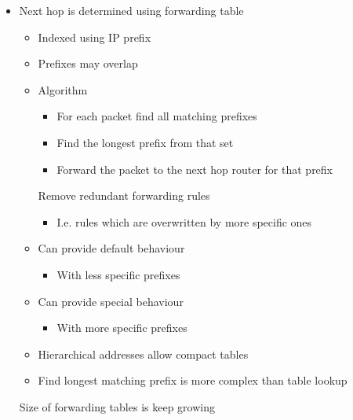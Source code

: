 \begin{itemize}
\begin{itemize}
            \item Next hop is determined using forwarding table
                \begin{itemize}
                    \item Indexed using IP prefix
                    \item Prefixes may overlap
                \end{itemize}
                \begin{itemize}
                    \item Algorithm
                        \begin{itemize}
                            \item For each packet find all matching prefixes
                            \item Find the longest prefix from that set
                            \item Forward the packet to the next hop router for that prefix
                        \end{itemize}
                     Remove redundant forwarding rules
                        \begin{itemize}
                            \item I.e. rules which are overwritten by more specific ones
                        \end{itemize}
                    \item Can provide default behaviour
                        \begin{itemize}
                            \item With less specific prefixes
                        \end{itemize}
                    \item Can provide special behaviour
                        \begin{itemize}
                            \item With more specific prefixes
                        \end{itemize}
                    \item Hierarchical addresses allow compact tables
                    \item Find longest matching prefix is more complex than table lookup
                \end{itemize}
            \icon Size of forwarding tables is keep growing

\end{itemize}
\end{itemize}
